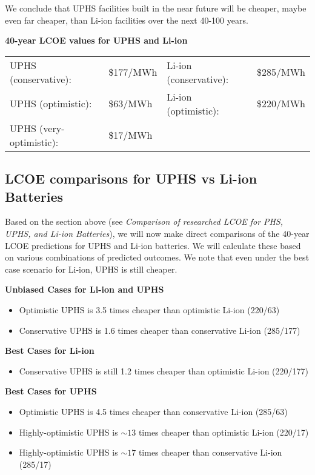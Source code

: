 We conclude that UPHS facilities built in the near future will be cheaper, maybe even far cheaper, than Li-ion facilities over the next 40-100 years.

\noindent\textbf{40-year LCOE values for UPHS and Li-ion}

\begin{tabular}{ llll }
UPHS (conservative): & \$177/MWh & Li-ion (conservative): & \$285/MWh \\
UPHS (optimistic): & \$63/MWh & Li-ion (optimistic): & \$220/MWh \\
UPHS (very-optimistic): & \$17/MWh \\
\end{tabular}

\subsection{LCOE comparisons for UPHS vs Li-ion Batteries}
Based on the section above (see \textit{Comparison of researched LCOE for PHS, UPHS, and Li-ion Batteries}), we will now make direct comparisons of the 40-year LCOE predictions for UPHS and Li-ion batteries. We will calculate these based on various combinations of predicted outcomes. We note that even under the best case scenario for Li-ion, UPHS is still cheaper.

\noindent\textbf{Unbiased Cases for Li-ion and UPHS}
\begin{itemize}
  \item Optimistic UPHS is 3.5 times cheaper than optimistic Li-ion (220/63)
  \item Conservative UPHS is 1.6 times cheaper than conservative Li-ion (285/177)
\end{itemize}

\noindent\textbf{Best Cases for Li-ion}
\begin{itemize}
  \item Conservative UPHS is still 1.2 times cheaper than optimistic Li-ion (220/177)
\end{itemize}

\noindent\textbf{Best Cases for UPHS}
\begin{itemize}
  \item Optimistic UPHS is 4.5 times cheaper than conservative Li-ion (285/63)
  \item Highly-optimistic UPHS is $\sim{13}$ times cheaper than optimistic Li-ion (220/17)
  \item Highly-optimistic UPHS is $\sim{17}$ times cheaper than conservative Li-ion (285/17)
\end{itemize}


